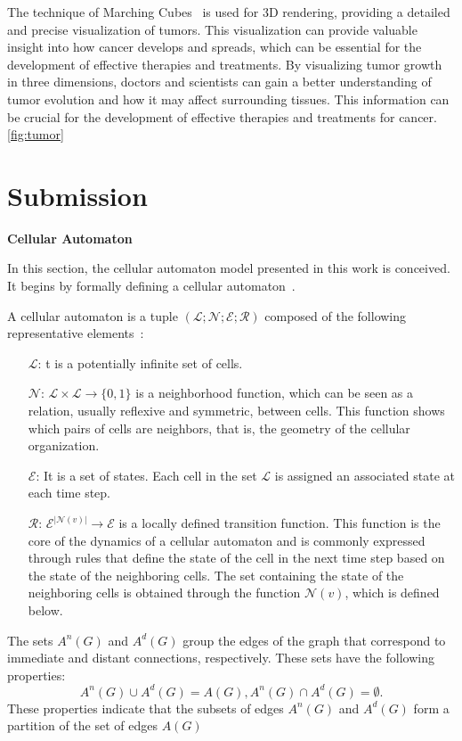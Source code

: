 \documentclass[a4paper,11pt]{article}
\begin{document}
{The technique of Marching Cubes~\cite{5} is used for 3D rendering, providing a detailed and precise visualization of tumors. This visualization can provide valuable insight into how cancer develops and spreads, which can be essential for the development of effective therapies and treatments. By visualizing tumor growth in three dimensions, doctors and scientists can gain a better understanding of tumor evolution and how it may affect surrounding tissues. This information can be crucial for the development of effective therapies and treatments for cancer.\ref{fig:tumor}

\section*{Submission}

\textbf{Cellular Automaton}

In this section, the cellular automaton model presented in this work is conceived. It begins by formally defining a cellular automaton~\cite{7}.

A cellular automaton is a tuple $(\mathcal{L}; \mathcal{N}; \mathcal{E}; \mathcal{R})$ composed of the following representative elements~\cite{2}:
\begin{itemize}
\item [$\mathcal{L}$:] t is a potentially infinite set of cells.
\item [$\mathcal{N}$:] $\mathcal{L} \times \mathcal{L} \rightarrow \lbrace 0,1 \rbrace$ is a neighborhood function, which can be seen as a relation, usually reflexive and symmetric, between cells. This function shows which pairs of cells are neighbors, that is, the geometry of the cellular organization.
\item [$\mathcal{E}$:] It is a set of states. Each cell in the set $\mathcal{L}$ is assigned an associated state at each time step.
\item [$\mathcal{R}$:] $\mathcal{E}^{|\mathcal{N}(v)|} \rightarrow \mathcal{E}$ is a locally defined transition function. This function is the core of the dynamics of a cellular automaton and is commonly expressed through rules that define the state of the cell in the next time step based on the state of the neighboring cells. The set containing the state of the neighboring cells is obtained through the function $\mathcal{N}(v)$, which is defined below.
\end{itemize}

The sets $A^n(G)$ and $A^d(G)$ group the edges of the graph that correspond to immediate and distant connections, respectively. These sets have the following properties:
\begin{subequations}
\begin{equation}
A^n(G) \cup A^d(G) = A(G),
\end{equation}
\begin{equation}
A^n(G) \cap A^d(G) = \emptyset.
\end{equation}
\end{subequations}
These properties indicate that the subsets of edges $A^n(G)$ and $A^d(G)$ form a partition of the set of edges $A(G)$

}
\end{document}
